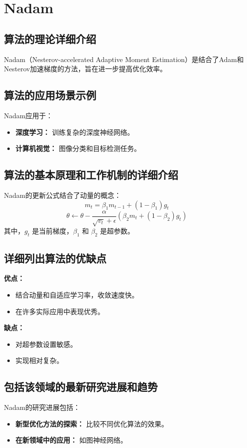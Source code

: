 \section{Nadam}
\subsection*{算法的理论详细介绍}
Nadam（Nesterov-accelerated Adaptive Moment Estimation）是结合了Adam和Nesterov加速梯度的方法，旨在进一步提高优化效率。

\subsection*{算法的应用场景示例}
Nadam应用于：
\begin{itemize}
    \item \textbf{深度学习：} 训练复杂的深度神经网络。
    \item \textbf{计算机视觉：} 图像分类和目标检测任务。
\end{itemize}

\subsection*{算法的基本原理和工作机制的详细介绍}
Nadam的更新公式结合了动量的概念：
\[
    m_t = \beta_1 m_{t-1} + (1 - \beta_1) g_t
\]
\[
    \theta \leftarrow \theta - \frac{\alpha}{\sqrt{v_t} + \epsilon} \left( \beta_2 m_t + (1 - \beta_2) g_t \right)
\]
其中，\(g_t\) 是当前梯度，\(\beta_1\) 和 \(\beta_2\) 是超参数。

\subsection*{详细列出算法的优缺点}
\textbf{优点：}
\begin{itemize}
    \item 结合动量和自适应学习率，收敛速度快。
    \item 在许多实际应用中表现优秀。
\end{itemize}

\textbf{缺点：}
\begin{itemize}
    \item 对超参数设置敏感。
    \item 实现相对复杂。
\end{itemize}

\subsection*{包括该领域的最新研究进展和趋势}
Nadam的研究进展包括：
\begin{itemize}
    \item \textbf{新型优化方法的探索：} 比较不同优化算法的效果。
    \item \textbf{在新领域中的应用：} 如图神经网络。
\end{itemize}
